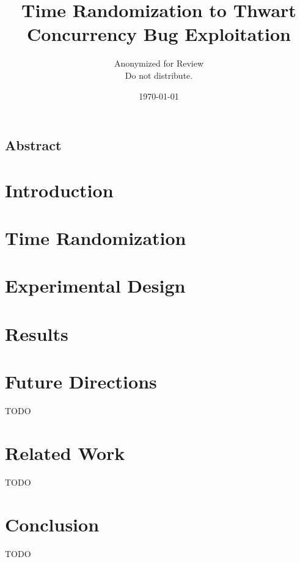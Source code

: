 \documentclass[letterpaper,twocolumn,10pt]{article}
\begin{document}
\date{\today}

\title{\Large \bf Time Randomization to Thwart Concurrency Bug Exploitation}

\author{
{\rm Anonymized for Review}\\
Do not distribute.
} %

\maketitle

\subsection*{Abstract}


\section{Introduction}


\section{Time Randomization}


\section{Experimental Design}


\section{Results}


\section{Future Directions}
TODO

\section{Related Work}
TODO

\section{Conclusion}
TODO

{\footnotesize 
}
\end{document}
